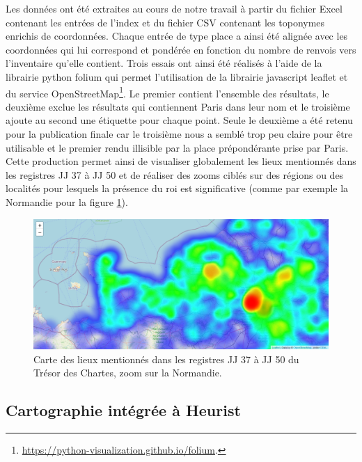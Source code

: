 \documentclass[a4paper,12pt,twoside]{book}
\begin{document}
	Les données ont été extraites au cours de notre travail à partir du fichier Excel contenant les entrées de l'index et du fichier CSV contenant les toponymes enrichis de coordonnées. Chaque entrée de type \og place\fg{} a ainsi été alignée avec les coordonnées qui lui correspond et pondérée en fonction du nombre de renvois vers l'inventaire qu'elle contient. Trois essais ont ainsi été réalisés à l'aide de la librairie python folium qui permet l'utilisation de la librairie javascript leaflet et du service OpenStreetMap\footnote{\url{https://python-visualization.github.io/folium}.}. Le premier contient l'ensemble des résultats, le deuxième exclue les résultats qui contiennent \og Paris\fg{} dans leur nom et le troisième ajoute au second une étiquette pour chaque point. Seule le deuxième a été retenu pour la publication finale car le troisième nous a semblé trop peu claire pour être utilisable et le premier rendu illisible par la place prépondérante prise par Paris. Cette production permet ainsi de visualiser globalement les lieux mentionnés dans les registres JJ 37 à JJ 50 et de réaliser des zooms ciblés sur des régions ou des localités pour lesquels la présence du roi est significative (comme par exemple la Normandie pour la figure \ref{Carte_zoom_Normandie}).
	
	\begin{figure}
		\centering
		\includegraphics[width=\textwidth]{Images/Carte_zoom_Normandie.png}
		\caption{Carte des lieux mentionnés dans les registres JJ 37 à JJ 50 du Trésor des Chartes, zoom sur la Normandie.}
		\label{Carte_zoom_Normandie}
	\end{figure}
	
	\subsection{Cartographie intégrée à Heurist}
	
\end{document}
